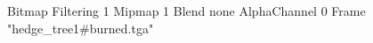 {Bitmap
	{Filtering 1}
	{Mipmap 1}
	{Blend none}
	{AlphaChannel 0}
	{Frame "hedge_tree1#burned.tga"}
}

